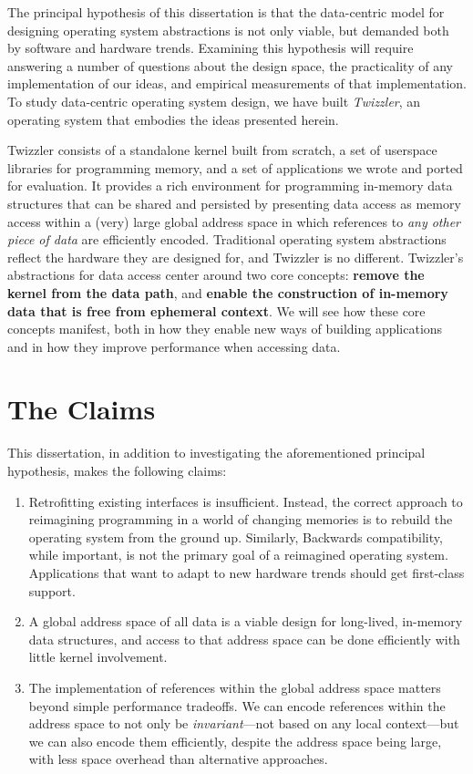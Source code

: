 The principal hypothesis of this dissertation is that the data-centric model for designing operating system abstractions
is not only viable, but demanded both by software and hardware trends. Examining this hypothesis will require answering
a number of questions about the design space, the practicality of any implementation of our ideas, and empirical
measurements of that implementation. To study data-centric operating system design, we have built \emph{Twizzler}, an
operating system that embodies the ideas presented herein.

Twizzler consists of a standalone kernel built from scratch, a set of userspace libraries for programming memory, and a
set of applications we wrote and ported for evaluation. It provides a rich environment for programming in-memory data
structures that can be shared and persisted by presenting data access as memory access within a (very) large global
address space in which references to \emph{any other piece of data} are efficiently encoded. Traditional operating
system abstractions reflect the hardware they are designed for, and Twizzler is no different. Twizzler's abstractions
for data access center around two core concepts: \textbf{remove the kernel from the data path}, and \textbf{enable the
    construction of in-memory data that is free from ephemeral context}. We will see how these core concepts manifest, both
in how they enable new ways of building applications and in how they improve performance when accessing data.

\section*{The Claims}

This dissertation, in addition to investigating the aforementioned principal hypothesis, makes the following claims:

\begin{enumerate}
    \item Retrofitting existing interfaces is insufficient. Instead, the correct approach to reimagining programming in
          a world of changing memories is to rebuild the operating system from the ground up.
          Similarly, Backwards compatibility, while important, is not the primary goal of a reimagined operating system.
          Applications that want to adapt to new hardware trends should get first-class support.
    \item A global address space of all data is a viable design for long-lived, in-memory data structures, and access to
          that address space can be done efficiently with little kernel involvement.
    \item The implementation of references within the global address space matters beyond simple performance tradeoffs.
          We can
          encode references within the address space to not only be \emph{invariant}---\ie not based on any local
          context---but we can also encode them efficiently, despite the address space being large, with less space
          overhead than alternative approaches.
\end{enumerate}


